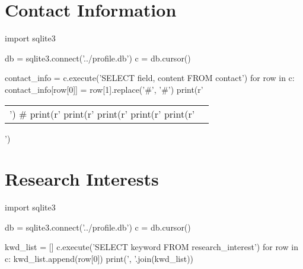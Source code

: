 \documentclass[margin,line]{res}
\begin{document}

\begin{resume}
\section{\sc Contact Information}
\vspace{.05in}
\begin{pycode}
import sqlite3

db = sqlite3.connect('../profile.db')
c = db.cursor()

contact_info = {}
c.execute('SELECT field, content FROM contact')
for row in c:
  contact_info[row[0]] = row[1].replace('#', '\#')
print(r'\begin{tabular}{@{}p{3in}p{4in}}')
# print(r'%
print(r'%
print(r'%
print(r'%
print(r'\end{tabular}')
\end{pycode}


\section{\sc Research Interests}
\begin{pycode}
import sqlite3

db = sqlite3.connect('../profile.db')
c = db.cursor()

kwd_list = []
c.execute('SELECT keyword FROM research_interest')
for row in c:
  kwd_list.append(row[0])
print(', '.join(kwd_list))
\end{pycode}


\end{resume}
\end{document}

